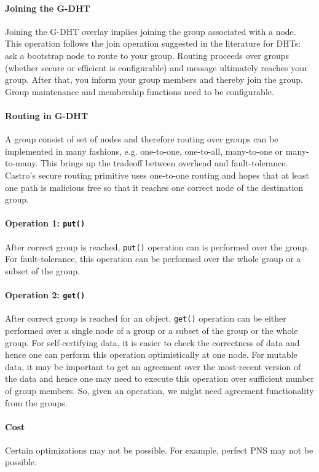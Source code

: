 \paragraph{Joining the G-DHT}
Joining the G-DHT overlay implies joining the group associated with a node. This operation follows the join operation suggested in the literature for DHTs: ask a bootstrap node to route to your group. Routing proceeds over groups (whether secure or efficient is configurable) and message ultimately reaches your group. After that, you inform your group members and thereby join the group. Group maintenance and membership functions need to be configurable.

\paragraph{Routing in G-DHT}
A group consist of set of nodes and therefore routing over groups can be implemented in many fashions, e.g. one-to-one, one-to-all, many-to-one or many-to-many. This brings up the tradeoff between overhead and fault-tolerance. Castro's secure routing primitive uses one-to-one routing and hopes that at least one path is malicious free so that it reaches one correct node of the destination group.

\paragraph{Operation 1: \texttt{put()}}
After correct group is reached, \texttt{put()} operation can is performed over the group. For fault-tolerance, this operation can be performed over the whole group or a subset of the group. 

\paragraph{Operation 2: \texttt{get()}}
After correct group is reached for an object, \texttt{get()} operation can be either performed over a single node of a group or a subset of the group or the whole group. For self-certifying data, it is easier to check the correctness of data and hence one can perform this operation optimistically at one node. For mutable data, it may be important to get an agreement over the most-recent version of the data and hence one may need to execute this operation over sufficient number of group members. So, given an operation, we might need agreement functionality from the groups.

\paragraph{Cost} Certain optimizations may not be possible. For example, perfect PNS may not be possible.

